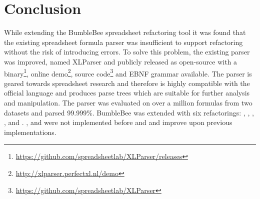 
\chapter{Conclusion}
\label{chapter:conclusion}

While extending the BumbleBee spreadsheet refactoring tool it was found that the existing spreadsheet formula parser was insufficient to support refactoring without the risk of introducing errors.
To solve this problem, the existing parser was improved, named XLParser and publicly released as open-source with a binary\footnote{\url{https://github.com/spreadsheetlab/XLParser/releases}}, online demo\footnote{\url{http://xlparser.perfectxl.nl/demo}}, source code\footnote{\url{https://github.com/spreadsheetlab/XLParser}} and EBNF grammar available.
The parser is geared towards spreadsheet research and therefore is highly compatible with the official language and produces parse trees which are suitable for further analysis and manipulation.
The parser was evaluated on over a million formulas from two datasets and parsed 99.999\%.
BumbleBee was extended with six refactorings: , , , ,  and .
,  and  were not implemented before and  and  improve upon previous implementations.